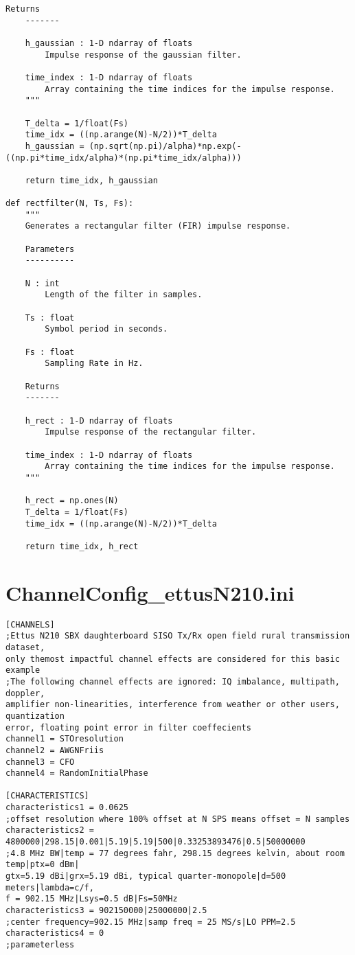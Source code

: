 \begin{lstlisting}[breaklines]
    Returns
    -------

    h_gaussian : 1-D ndarray of floats
        Impulse response of the gaussian filter.

    time_index : 1-D ndarray of floats
        Array containing the time indices for the impulse response.
    """

    T_delta = 1/float(Fs)
    time_idx = ((np.arange(N)-N/2))*T_delta
    h_gaussian = (np.sqrt(np.pi)/alpha)*np.exp(-((np.pi*time_idx/alpha)*(np.pi*time_idx/alpha)))

    return time_idx, h_gaussian

def rectfilter(N, Ts, Fs):
    """
    Generates a rectangular filter (FIR) impulse response.

    Parameters
    ----------

    N : int
        Length of the filter in samples.

    Ts : float
        Symbol period in seconds.

    Fs : float
        Sampling Rate in Hz.

    Returns
    -------

    h_rect : 1-D ndarray of floats
        Impulse response of the rectangular filter.

    time_index : 1-D ndarray of floats
        Array containing the time indices for the impulse response.
    """

    h_rect = np.ones(N)
    T_delta = 1/float(Fs)
    time_idx = ((np.arange(N)-N/2))*T_delta

    return time_idx, h_rect
\end{lstlisting}

\section{ChannelConfig\_ettusN210.ini}
\begin{lstlisting}
[CHANNELS]
;Ettus N210 SBX daughterboard SISO Tx/Rx open field rural transmission dataset,
only themost impactful channel effects are considered for this basic example
;The following channel effects are ignored: IQ imbalance, multipath, doppler,
amplifier non-linearities, interference from weather or other users, quantization
error, floating point error in filter coeffecients
channel1 = STOresolution
channel2 = AWGNFriis
channel3 = CFO
channel4 = RandomInitialPhase

[CHARACTERISTICS]
characteristics1 = 0.0625
;offset resolution where 100% offset at N SPS means offset = N samples
characteristics2 = 4800000|298.15|0.001|5.19|5.19|500|0.33253893476|0.5|50000000
;4.8 MHz BW|temp = 77 degrees fahr, 298.15 degrees kelvin, about room temp|ptx=0 dBm|
gtx=5.19 dBi|grx=5.19 dBi, typical quarter-monopole|d=500 meters|lambda=c/f,
f = 902.15 MHz|Lsys=0.5 dB|Fs=50MHz
characteristics3 = 902150000|25000000|2.5
;center frequency=902.15 MHz|samp freq = 25 MS/s|LO PPM=2.5
characteristics4 = 0
;parameterless
\end{lstlisting}

